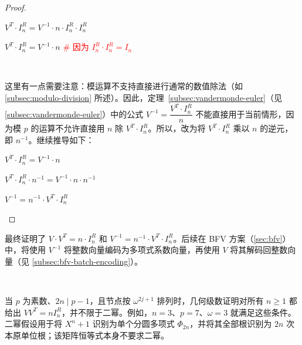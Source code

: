 \begin{proof}
\begin{enumerate}
$V^T \cdot I_n^R = V^{-1} \cdot n \cdot I_n^R  \cdot I_n^R$

$V^T \cdot I_n^R = V^{-1} \cdot n$ \textcolor{red}{\text{ } \# 因为 $I_n^R  \cdot I_n^R = I_n$}

$ $

这里有一点需要注意：模运算不支持直接进行通常的数值除法（如 \autoref{subsec:modulo-division} 所述）。因此，定理~\ref*{subsec:vandermonde-euler}（见 \autoref{subsec:vandermonde-euler}）中的公式 $V^{-1} = \dfrac{V^T \cdot I_n^R}{n}$ 不能直接用于当前情形，因为模 $p$ 的运算不允许直接用 $n$ 除 $V^T \cdot I_n^R$。所以，改为将 $V^T \cdot I_n^R$ 乘以 $n$ 的逆元，即 $n^{-1}$。继续推导如下：

$V^T \cdot I_n^R = V^{-1} \cdot n$

$V^T \cdot I_n^R \cdot n^{-1}= V^{-1} \cdot n \cdot n^{-1}$

$V^{-1} = n^{-1}\cdot V^T \cdot I_n^R$

\end{enumerate}
\end{proof}

最终证明了 $V\cdot V^T = n \cdot I_n^R$ 和 $V^{-1} = n^{-1}\cdot V^T \cdot I_n^R$。后续在 BFV 方案（\autoref{sec:bfv}）中，将使用 $V^{-1}$ 将整数向量编码为多项式系数向量，再使用 $V$ 将其解码回整数向量（见 \autoref{subsec:bfv-batch-encoding}）。

$ $

当 $p$ 为素数、$2n\mid p-1$，且节点按 $\omega^{2j+1}$ 排列时，几何级数证明对所有 $n\ge1$ 都给出 $V V^T=n I_n^R$，并不限于二幂。例如，$n=3$、$p=7$、$\omega=3$ 就满足这些条件。二幂假设用于将 $X^n+1$ 识别为单个分圆多项式 $\Phi_{2n}$，并将其全部根识别为 $2n$ 次本原单位根；该矩阵恒等式本身不要求二幂。
